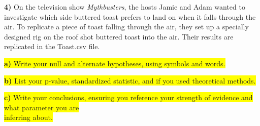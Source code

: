 \documentclass{article}
\newif\ifPrintSolution
\newcommand{\sol}[1]{\ifPrintSolution {\color{blue} #1 } \fi}
\begin{document}
\textbf{4) } On the television show \textit{Mythbusters}, the hosts Jamie and Adam wanted to investigate which side buttered toast prefers to land on when it falls through the air. To replicate a piece of toast falling through the air, they set up a specially designed rig on the roof shot buttered toast into the air. Their results are replicated in the \color{blue} Toast.csv \color{black} file. 

\hspace{0.1in} \colorbox{yellow}{\textbf{a) } Write your null and alternate hypotheses, using symbols and words.}

\sol{$H_0: \pi = 0.5$. The true long-run proportion of times that buttered toast lands with buttered side down is 0.5.\\
$H_a: \pi \ne 0.5$. The true long-run proportion of times that buttered toast lands with buttered side down is not equal to 0.5.}

\vspace{0.25in}

\hspace{0.1in} \colorbox{yellow}{\textbf{b) } List your p-value, standardized statistic, and if you used theoretical methods.}

\sol{We have at least 10 successes and 10 failures, so we will use theoretical methods to calculate z and p-value.\\
$\hat{p} = \frac{19}{48} = 0.395833\\
z = \frac{\hat{p} - \pi_0}{\sqrt{\frac{\pi \times (1 - \pi)}{n}}} = \frac{0.395833 - 0.5}{\sqrt{\frac{0.5 \times 0.5}{48}}} = -1.443376$ \\
p-value = $2 \times (1 - pnorm(abs(-1.443376))) = 0.1489147$}


  


\vspace{0.25in}

\hspace{0.1in} \colorbox{yellow}{\textbf{c) } Write your conclusions, ensuring you reference your strength of evidence and what parameter you are} \\ \colorbox{yellow}{inferring about.}

\sol{With a p-value of 0.1489147 and standardized statistic of -1.443376, we conclude that our observed statistic of 0.395833 provides weak evidence against our null hypothesis that the true long-run proportion of times that buttered toast lands with buttered side down is 50$\%$. It is feasible that the side buttered toast lands on is purely random with no preference with regards to side.}
\end{document}
